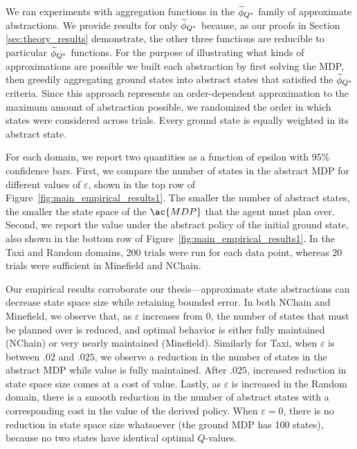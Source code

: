We ran experiments with aggregation functions in the $\widetilde \phi_{Q^*}$ family of approximate abstractions. We provide results for only $\widetilde \phi_{Q^*}$ because, as our proofs in Section \ref{sec:theory_results} demonstrate, the other three functions are reducible to particular $\widetilde \phi_{Q^*}$ functions. For the purpose of illustrating what kinds of approximations are possible we built each abstraction by first solving the MDP, then greedily aggregating ground states into abstract states that satisfied the $\widetilde \phi_{Q^*}$ criteria. Since this approach represents an order-dependent approximation to the maximum amount of abstraction possible, we randomized the order in which states were considered across trials. Every ground state is equally weighted in its abstract state.

For each domain, we report two quantities as a function of epsilon with 95\% confidence bars. First, we compare the number of states in the abstract \ac{MDP} for different values of $\varepsilon$, shown in the top row of Figure~\ref{fig:main_empirical_results1}. The smaller the number of abstract states, the smaller the state space of the $\ac{MDP}$ that the agent must plan over. Second, we report the value under the abstract policy of the initial ground state, also shown in the bottom row of Figure~\ref{fig:main_empirical_results1}. In the Taxi and Random domains, 200 trials were run for each data point, whereas 20 trials were sufficient in Minefield and NChain.

Our empirical results corroborate our thesis---approximate state abstractions can decrease state space size while retaining bounded error. In both NChain and Minefield, we observe that, as $\varepsilon$ increases from $0$, the number of states that must be planned over is reduced, and optimal behavior is either fully maintained (NChain) or very nearly maintained (Minefield). Similarly for Taxi, when $\varepsilon$ is between $.02$ and $.025$, we observe a reduction in the number of states in the abstract \ac{MDP} while value is fully maintained. After $.025$, increased reduction in state space size comes at a cost of value. Lastly, as $\varepsilon$ is increased in the Random domain, there is a smooth reduction in the number of abstract states with a corresponding cost in the value of the derived policy. When $\varepsilon = 0$, there is no reduction in state space size whatsoever (the ground \ac{MDP} has 100 states), because no two states have identical optimal $Q$-values.

